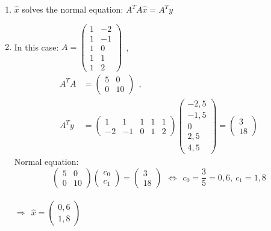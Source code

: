 {\color{solution}
\begin{enumerate}
	\item $\hat{x}$ solves the normal equation: $A^TA\hat{x}=A^Ty$
	\item In this case: $A=\begin{pmatrix}1&-2\\1&-1\\1&0\\1&1\\1&2\end{pmatrix}~~$,
	\begin{align*}
	A^TA&=\begin{pmatrix}5&0\\0&10\end{pmatrix}~~,\\
	A^Ty&=\begin{pmatrix}1&1&1&1&1\\-2&-1&0&1&2\end{pmatrix}
	\begin{pmatrix}-2,5\\-1,5\\0\\2,5\\4,5\end{pmatrix}
	=\begin{pmatrix}3\\18\end{pmatrix}
	\end{align*}
	Normal equation: $$\begin{pmatrix}5&0\\0&10\end{pmatrix}
	\begin{pmatrix}c_0\\c_1\end{pmatrix}
	=\begin{pmatrix}3\\18\end{pmatrix}
	~~\Leftrightarrow~~c_0=\frac{3}{5}=0,6,~c_1=1,8$$\\
	$\Rightarrow~~\hat{x}=
	\begin{pmatrix}0,6\\1,8\end{pmatrix}$
\end{enumerate}
}
